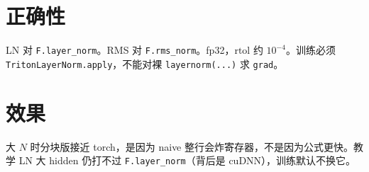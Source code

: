 \section{正确性}

\begin{note}
LN 对 \texttt{F.layer\_norm}。RMS 对 \texttt{F.rms\_norm}。fp32，$\mathrm{rtol}$ 约 $10^{-4}$。训练必须 \texttt{TritonLayerNorm.apply}，不能对裸 \texttt{layernorm(...)} 求 \texttt{grad}。
\end{note}

\section{效果}

\begin{remark}
大 $N$ 时分块版接近 torch，是因为 naive 整行会炸寄存器，不是因为公式更快。教学 LN 大 hidden 仍打不过 \texttt{F.layer\_norm}（背后是 cuDNN），训练默认不换它。
\end{remark}
